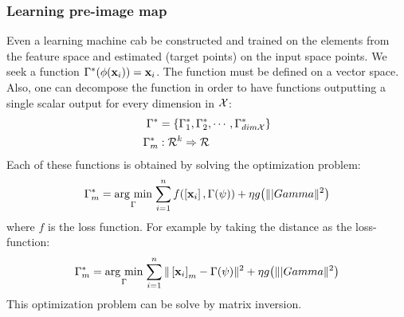 \documentclass[12pt, letterpaper]{article}
\theoremstyle{definition}
\newcommand{\x}{\mathbf{x}}
\DeclarePairedDelimiter\autobracket{(}{)}
\newcommand{\br}[1]{\autobracket*{#1}}
\newcommand{\argmin}[1]{\underset{#1}{\operatorname{arg}\,\operatorname{min}}\;}
\begin{document}
\subsubsection{Learning pre-image map}
Even a learning machine cab be constructed and trained on the elements from the feature space and estimated (target points) on the input space points. We seek a function $\Gamma^*\br{\phi(\x_i)} = \x_i$. The function must be defined on a vector space. Also, one can decompose the function in order to have functions outputting a single scalar output for every dimension in $\CMcal{X}$: 
\begin{equation}
\begin{aligned}
\Gamma^* &= \{\Gamma^*_1, \Gamma^*_2, \cdots, \Gamma^*_{dim{\CMcal{X}}}\}\\
\Gamma^*_m&: \CMcal{R}^k \Rightarrow \CMcal{R}
\end{aligned}
\end{equation}
Each of these functions is obtained by solving the optimization problem:
\begin{equation}
 \Gamma^*_m = \argmin{\Gamma}{\sum_{i=1}^n f\br{\left[\x_i\right], \Gamma(\psi)}+\eta g\br{\||Gamma\|^2}}
\end{equation}
where $f$ is the loss function. For example by taking the distance as the loss-function:
\begin{equation}
 \Gamma^*_m = \argmin{\Gamma}{\sum_{i=1}^n \|\left[\x_i\right]_m - \Gamma\br{\psi}\|^2+\eta g\br{\||Gamma\|^2}}
\end{equation}
This optimization problem can be solve by matrix inversion.
\end{document}
